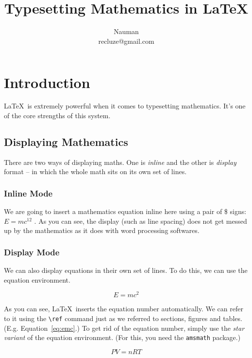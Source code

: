 \documentclass{book}
\begin{document}
\title{Typesetting Mathematics in \LaTeX}
\author{Nauman \\ recluze@gmail.com}
\maketitle


\chapter{Introduction} 
\LaTeX\ is extremely powerful when it comes to typesetting mathematics. It's one of the core strengths of this system. 

\section{Displaying Mathematics}
There are two ways of displaying maths. One is \emph{inline} and the other is \emph{display} format -- in which the whole math sits on its own set of lines.


\subsection{Inline Mode}
We are going to insert a mathematics equation inline here using a pair of \$ signs:  $E = mc^{12} $  . As you can see, the display (such as line spacing) does not get messed up by the mathematics as it does with word processing softwares. 

\subsection{Display Mode}
We can also display equations in their own set of lines. To do this, we can use the equation environment. 

\begin{equation}\label{eq:emc}
E=mc^2
\end{equation}

As you can see, \LaTeX\ inserts the equation number automatically. We can refer to it using the \verb|\ref| command just as we referred to sections, figures and tables. (E.g. Equation~\ref{eq:emc}.) To get rid of the equation number, simply use the \emph{star variant} of the equation environment. (For this, you need the \texttt{amsmath} package.)

\begin{equation}\label{eq:pvnrt}
PV=nRT
\end{equation}
\end{document}
